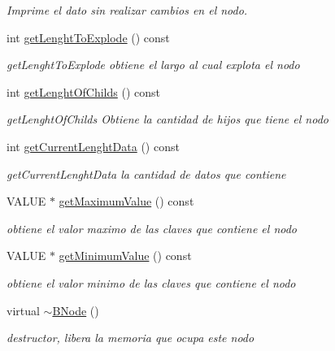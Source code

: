\begin{DoxyCompactItemize}
\begin{DoxyCompactList}\small\item\em Imprime el dato sin realizar cambios en el nodo. \end{DoxyCompactList}\item 
int \hyperlink{classBNode_a03d3802d7b1d173e051378692a6b8687}{get\-Lenght\-To\-Explode} () const 
\begin{DoxyCompactList}\small\item\em get\-Lenght\-To\-Explode obtiene el largo al cual explota el nodo \end{DoxyCompactList}\item 
int \hyperlink{classBNode_a7d3bd370d42465e8c2aa014645cac8d1}{get\-Lenght\-Of\-Childs} () const 
\begin{DoxyCompactList}\small\item\em get\-Lenght\-Of\-Childs Obtiene la cantidad de hijos que tiene el nodo \end{DoxyCompactList}\item 
int \hyperlink{classBNode_a8af2d0b3078416d0cd7459addf63876f}{get\-Current\-Lenght\-Data} () const 
\begin{DoxyCompactList}\small\item\em get\-Current\-Lenght\-Data la cantidad de datos que contiene \end{DoxyCompactList}\item 
V\-A\-L\-U\-E $\ast$ \hyperlink{classBNode_a05a6d30b4dbe5e81fcbee26f365a2cca}{get\-Maximum\-Value} () const 
\begin{DoxyCompactList}\small\item\em obtiene el valor maximo de las claves que contiene el nodo \end{DoxyCompactList}\item 
V\-A\-L\-U\-E $\ast$ \hyperlink{classBNode_ab81e066860a4d57a419dc594e8fc3914}{get\-Minimum\-Value} () const 
\begin{DoxyCompactList}\small\item\em obtiene el valor minimo de las claves que contiene el nodo \end{DoxyCompactList}\item 
\hypertarget{classBNode_ac92421575ed510386d4e4ec1ab8ab1a4}{virtual \hyperlink{classBNode_ac92421575ed510386d4e4ec1ab8ab1a4}{$\sim$\-B\-Node} ()}\label{classBNode_ac92421575ed510386d4e4ec1ab8ab1a4}

\begin{DoxyCompactList}\small\item\em destructor, libera la memoria que ocupa este nodo \end{DoxyCompactList}\end{DoxyCompactItemize}


